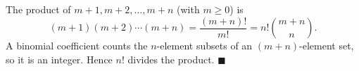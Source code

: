 The product of $m+1,m+2,\dots,m+n$ (with $m\ge0$) is
\[(m+1)(m+2)\cdots(m+n)=\dfrac{(m+n)!}{m!}=n!\binom{m+n}{n}.\]
A binomial coefficient counts the $n$-element subsets of an $(m+n)$-element set, so it is an integer. Hence $n!$ divides the product. $\blacksquare$
